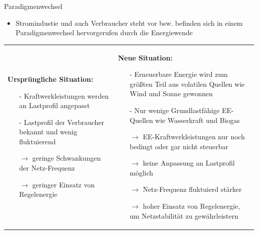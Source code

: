 \documentclass[aspectratio=1610, professionalfonts, 9pt]{beamer}
\begin{document}
\begin{frame}{Paradigmenwechsel}
\begin{itemize}
  \item Stromindustie und auch Verbraucher
  steht vor bsw. befinden sich
  in einem Paradigmenwechsel hervorgerufen durch die Energiewende
\end{itemize}
%
 \begin{tabular}{p{}p{}}
 \textbf{\textcolor{tugreen}{ Ursprüngliche Situation:}}

 \begin{itemize}
     \item[-] Kraftwerkleistungen werden an Lastprofil angepasst
     \item[-] Lastprofil der Verbraucher bekannt und wenig fluktuierend
         \item[$\rightarrow$] geringe Schwankungen der Netz-Frequenz
         \item[$\rightarrow$] geringer Einsatz von Regelenergie
   \end{itemize}
 &
 \textbf{\textcolor{tugreen}{Neue Situation:}}
    \begin{itemize}
      \item[-] Erneuerbare Energie wird zum größten Teil aus volatilen Quellen wie Wind und Sonne gewonnen
      \item[-] Nur wenige Grundlastfähige EE-Quellen wie Wasserkraft und Biogas
      \item[$\rightarrow$] EE-Kraftwerkleistungen nur noch bedingt oder gar nicht steuerbar
      \item[$\rightarrow$] keine Anpassung an Lastprofil möglich
      \item[$\rightarrow$] Netz-Frequenz fluktuierd stärker
      \item[$\rightarrow$] hoher Einsatz von Regelenergie, um Netzstabilität zu gewährleistern
    \end{itemize}\\
  \end{tabular}
\end{frame}
\end{document}
